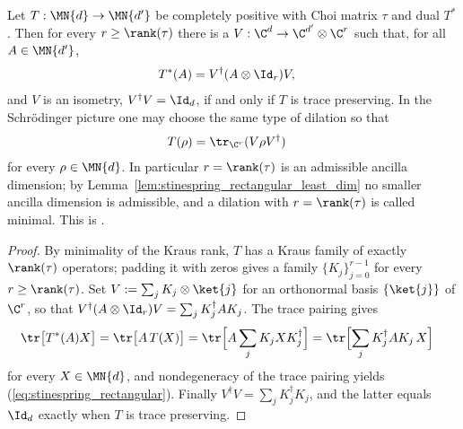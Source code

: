 \begin{theorem}
    \label{thm:stinespring_rectangular}
    \leanok
    Let $T:\MN{d}\to\MN{d'}$ be completely positive with Choi matrix $\tau$ and
    dual $T^*$. Then for every $r\geq\rank(\tau)$ there is a
    $V:\C^{d}\to\C^{d'}\otimes\C^{r}$ such that, for all $A\in\MN{d'}$,
    \begin{align}
        T^*(A)&=V^\dagger(A\otimes\Id_r)V,
        \label{eq:stinespring_rectangular}
    \end{align}
    and $V$ is an isometry, $V^\dagger V=\Id_d$, if and only if $T$ is trace
    preserving. In the Schr\"odinger picture one may choose the same type of
    dilation so that
    \begin{align}
        T(\rho)&=\tr_{\C^r}(V\rho V^\dagger)
        \label{eq:stinespring_rectangular_schrodinger}
    \end{align}
    for every $\rho\in\MN{d}$. In particular $r=\rank(\tau)$ is an admissible
    ancilla dimension; by
    Lemma~\ref{lem:stinespring_rectangular_least_dim} no smaller
    ancilla dimension is admissible, and a dilation with $r=\rank(\tau)$ is
    called minimal. This is \cite[Theorem~2.2]{Wolf2012Quantum}.
\end{theorem}

\begin{proof}
    \leanok
    By minimality of the Kraus rank, $T$ has a Kraus family of exactly
    $\rank(\tau)$ operators; padding it with zeros gives a family
    $\{K_j\}_{j=0}^{r-1}$ for every $r\geq\rank(\tau)$. Set
    $V:=\sum_j K_j\otimes\ket{j}$ for an orthonormal basis $\{\ket{j}\}$ of
    $\C^{r}$, so that $V^\dagger(A\otimes\Id_r)V=\sum_j K_j^\dagger AK_j$. The
    trace pairing gives
    \begin{align}
        \tr\bigl[T^*(A)X\bigr]
        &=\tr\bigl[A\,T(X)\bigr]
          =\tr\Bigl[A\sum_j K_jXK_j^\dagger\Bigr]
          =\tr\Bigl[\sum_j K_j^\dagger AK_j\,X\Bigr]
        \label{eq:stinespring_rectangular_pairing}
    \end{align}
    for every $X\in\MN{d}$, and nondegeneracy of the trace pairing yields
    (\ref{eq:stinespring_rectangular}). Finally
    $V^\dagger V=\sum_j K_j^\dagger K_j$, and the latter equals $\Id_d$
    exactly when $T$ is trace preserving.
\end{proof}

